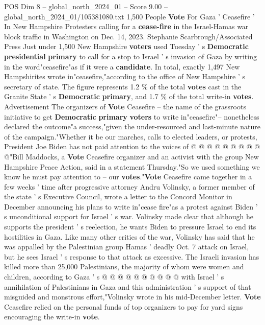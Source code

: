 \begin{textsample}{POS Dim 8 – global\_north\_2024\_01 – Score 9.00 – global\_north\_2024\_01/105381080.txt}  \label{ex:f8_pos_182}
1,500 People \textbf{Vote} For Gaza ' Ceasefire ' In New Hampshire Protesters calling for a \textbf{cease-fire} in the Israel-Hamas war block traffic in Washington on Dec. 14, 2023.
Stephanie Scarbrough/Associated Press Just under 1,500 New Hampshire \textbf{voters} used Tuesday ' s \textbf{Democratic} \textbf{presidential} \textbf{primary} to call for a stop to Israel ' s invasion of Gaza by writing in the word"ceasefire"as if it were a \textbf{candidate}.
In total, exactly 1,497 New Hampshirites wrote in"ceasefire,"according to the office of New Hampshire ' s secretary of state.
The figure represents 1.2 \% of the total \textbf{votes} cast in the Granite State ' s \textbf{Democratic} \textbf{primary}, and 1.7 \% of the total write-in \textbf{votes}.
Advertisement The organizers of \textbf{Vote} Ceasefire -- the name of the grassroots initiative to get \textbf{Democratic} \textbf{primary} \textbf{voters} to write in"ceasefire"-- nonetheless declared the outcome"a success,"given the under-resourced and last-minute nature of the campaign."Whether it be our marches, calls to elected leaders, or protests, President Joe Biden has not paid attention to the voices of @ @ @ @ @ @ @ @ @ @"Bill Maddocks, a \textbf{Vote} Ceasefire organizer and an activist with the group New Hampshire Peace Action, said in a statement Thursday."So we used something we know he must pay attention to -- our \textbf{votes}."\textbf{Vote} Ceasefire came together in a few weeks ' time after progressive attorney Andru Volinsky, a former member of the state ' s Executive Council, wrote a letter to the Concord Monitor in December announcing his plans to write in"cease fire"as a protest against Biden ' s unconditional support for Israel ' s war.
Volinsky made clear that although he supports the president ' s reelection, he wants Biden to pressure Israel to end its hostilities in Gaza.
Like many other critics of the war, Volinsky has said that he was appalled by the Palestinian group Hamas ' deadly Oct. 7 attack on Israel, but he sees Israel ' s response to that attack as excessive.
The Israeli invasion has killed more than 25,000 Palestinians, the majority of whom were women and children, according to Gaza ' s @ @ @ @ @ @ @ @ @ @ with Israel ' s annihilation of Palestinians in Gaza and this administration ' s support of that misguided and monstrous effort,"Volinsky wrote in his mid-December letter. \textbf{Vote} Ceasefire relied on the personal funds of top organizers to pay for yard signs encouraging the write-in \textbf{vote}.

\end{textsample}

